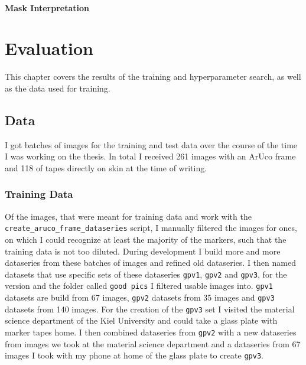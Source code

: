 \documentclass[10pt]{book}
\begin{document}
\subsubsection{Mask Interpretation}


\chapter{Evaluation}
\label{chap:eval}

This chapter covers the results of the training and hyperparameter search, as well as the data used for training.

\section{Data}

I got batches of images for the training and test data over the course of the time I was working on the thesis. In total I received 261 images with an \ac{ArUco} frame and 118 of tapes directly on skin at the time of writing. 

\subsection{Training Data}

Of the images, that were meant for training data and work with the \texttt{create\_aruco\_frame\_dataseries} script, I manually filtered the images for ones, on which I could recognize at least the majority of the markers, such that the training data is not too diluted. During development I build more and more dataseries from these batches of images and refined old dataseries. I then named datasets that use specific sets of these dataseries \texttt{gpv1}, \texttt{gpv2} and \texttt{gpv3}, for the version and the folder called \texttt{good pics} I filtered usable images into. \texttt{gpv1} datasets are build from 67 images, \texttt{gpv2} datasets from 35 images and \texttt{gpv3} datasets from 140 images. For the creation of the \texttt{gpv3} set I visited the material science department of the Kiel University and could take a glass plate with marker tapes home. I then combined dataseries from \texttt{gpv2} with a new dataseries from images we took at the material science department and a dataseries from 67 images I took with my phone at home of the glass plate to create \texttt{gpv3}.
\end{document}
